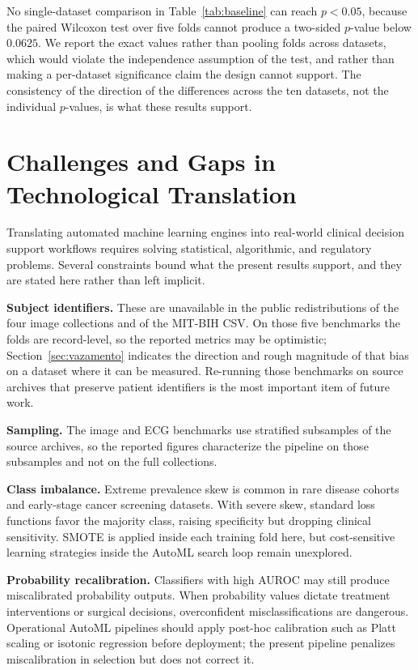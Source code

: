 \documentclass[conference]{IEEEtran}
\begin{document}

No single-dataset comparison in Table~\ref{tab:baseline} can reach $p<0.05$, because the paired Wilcoxon test over five folds cannot produce a two-sided $p$-value below $0.0625$. We report the exact values rather than pooling folds across datasets, which would violate the independence assumption of the test, and rather than making a per-dataset significance claim the design cannot support. The consistency of the direction of the differences across the ten datasets, not the individual $p$-values, is what these results support.

\section{Challenges and Gaps in Technological Translation}
\label{sec:desafios}
Translating automated machine learning engines into real-world clinical decision support workflows requires solving statistical, algorithmic, and regulatory problems. Several constraints bound what the present results support, and they are stated here rather than left implicit.

\textbf{Subject identifiers.} These are unavailable in the public redistributions of the four image collections and of the MIT-BIH CSV. On those five benchmarks the folds are record-level, so the reported metrics may be optimistic; Section~\ref{sec:vazamento} indicates the direction and rough magnitude of that bias on a dataset where it can be measured. Re-running those benchmarks on source archives that preserve patient identifiers is the most important item of future work.

\textbf{Sampling.} The image and ECG benchmarks use stratified subsamples of the source archives, so the reported figures characterize the pipeline on those subsamples and not on the full collections.

\textbf{Class imbalance.} Extreme prevalence skew is common in rare disease cohorts and early-stage cancer screening datasets. With severe skew, standard loss functions favor the majority class, raising specificity but dropping clinical sensitivity. SMOTE is applied inside each training fold here, but cost-sensitive learning strategies inside the AutoML search loop remain unexplored.

\textbf{Probability recalibration.} Classifiers with high AUROC may still produce miscalibrated probability outputs. When probability values dictate treatment interventions or surgical decisions, overconfident misclassifications are dangerous. Operational AutoML pipelines should apply post-hoc calibration such as Platt scaling or isotonic regression before deployment; the present pipeline penalizes miscalibration in selection but does not correct it.
\end{document}
